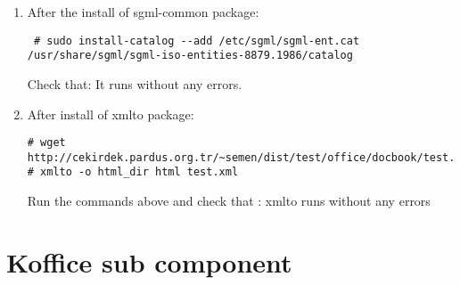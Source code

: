 \documentclass[a4paper,10pt]{article}
\begin{document}
\begin{enumerate}
\item After the install of sgml-common package:
\begin{verbatim}
 # sudo install-catalog --add /etc/sgml/sgml-ent.cat /usr/share/sgml/sgml-iso-entities-8879.1986/catalog
\end{verbatim}

Check that: It runs without any errors.
\item After install of xmlto package:

\begin{verbatim}
# wget http://cekirdek.pardus.org.tr/~semen/dist/test/office/docbook/test.xml
# xmlto -o html_dir html test.xml
\end{verbatim}

Run the commands above and check that : xmlto runs without any errors
\end{enumerate}
\section{Koffice sub component}
\end{document}
